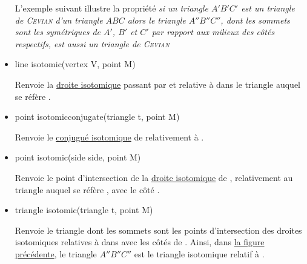 \documentclass[pdftex]{article}
\begin{document}
\begin{itemize}
  L'exemple suivant illustre la propriété \og{}\emph{si un
    triangle $A'B'C'$ est un triangle de \textsc{Cevian} d'un triangle
    $ABC$ alors le triangle $A''B''C''$, dont les sommets sont les symétriques de
    $A'$, $B'$ et $C'$ par rapport aux milieux des côtés respectifs,
    est aussi un triangle de \hypertarget{cevian_ex}{\textsc{Cevian}}}\fg{}
\item {}
  \begin{Vcolor}
    line isotomic(vertex V, point M)
  \end{Vcolor}
  Renvoie la
  \href{http://mathworld.wolfram.com/IsotomicLines.html}{droite
    isotomique} passant par  et relative à  dans le
  triangle auquel se réfère .
\item {}
  \begin{Vcolor}
    point isotomicconjugate(triangle t, point M)
  \end{Vcolor}
  Renvoie le
  \href{http://mathworld.wolfram.com/IsotomicLines.html}{conjugué
    isotomique} de  relativement à .
\item {}
  \begin{Vcolor}
    point isotomic(side side, point M)
  \end{Vcolor}
  Renvoie le point d'intersection de la
  \href{http://mathworld.wolfram.com/IsotomicLines.html}{droite
    isotomique} de , relativement au triangle auquel se
  réfère , avec le côté .
\item {}
  \begin{Vcolor}
    triangle isotomic(triangle t, point M)
  \end{Vcolor}
  Renvoie le triangle dont les sommets sont les points d'intersection
  des droites isotomiques relatives à  dans  avec les
  côtés de . Ainsi, dans \href{#cevian_ex}{la figure
    précédente}, le triangle $A''B''C''$ est le triangle isotomique
  relatif à .


\end{itemize}
\end{document}

